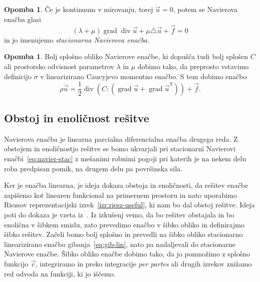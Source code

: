\documentclass[12pt,a4paper,twoside]{article}
\theoremstyle{definition} %
\newtheorem{opomba}[definicija]{Opomba}
\theoremstyle{plain} %
\numberwithin{equation}{section}
\newcommand{\T}{\mathsf{T}}
\newcommand{\lap}{\triangle}
\renewcommand{\div}{\operatorname{div}}
\newcommand{\grad}{\operatorname{grad}}
\newcommand{\vv}{\vec{v}}
\newcommand{\vu}{\vec{u}}
\newcommand{\vf}{\vec{f}}
\newcommand{\ts}{\sigma}
\begin{document}
\begin{opomba}
  Če je kontinuum v mirovanju, torej $\dot{\vu} = 0$, potem se Navierova enačba glasi
\begin{equation}
    (\lambda + \mu)\grad\div \vu + \mu \lap \vu + \vf  = 0
  \label{eq:navier-stac}
\end{equation}
in jo imenujemo \emph{stacionarna Navierova enačba}.
\end{opomba}
\begin{opomba}
  Bolj splošno obliko Navierove enačbe, ki dopušča tudi bolj splošen $C$ ali
  prostorsko odvisnost parametrov $\lambda$ in $\mu$
  dobimo tako, da preprosto vstavimo definicijo $\ts$ v linearizirano
  Caucyjevo momentno enačbo. S tem dobimo enačbo
  \begin{equation}
    \rho\ddot \vu = \frac12 \div(C:(\grad \vu + \grad\vu^\T)) + \vf.
    \label{eq:navier-general}
  \end{equation}
\end{opomba}

\subsection{Obstoj in enoličnost rešitve}
\label{sec:obstoj-enol}
Navierova enačba je linearna parcialna diferencialna enačba drugega reda.
Z obstojem in enoličnostjo rešitve se bomo ukvarjali pri stacionarni Navierovi
enačbi~\eqref{eq:navier-stac} z mešanimi robnimi pogoji pri katerih je na nekem
delu roba predpisan pomik, na drugem delu pa površinska sila.

Ker je enačba linearna, je ideja dokaza obstoja in enoličnosti, da rešitev
enačbe zapišemo kot linearen funkcional na primernem prostoru in nato uporabimo
Riezsov reprezentacijski izrek~\ref{izr:riesz-useful}, ki nam bo dal obstoj
rešitve. Ideja poti do dokaza je vzeta iz~\cite[izrek 3.17.1, str.\
232]{lebedev2009introduction}. Iz izkušenj vemo, da bo rešitev obstajala in bo
enolična v šibkem smislu, zato prevedimo enačbo v šibko obliko in definirajmo
šibko rešitev. Začeli bomo bolj splošno in prevedli na šibko obliko
stacionarno linearizirano enačbo gibanja~\eqref{eq:gib-lin}, nato pa nadaljevali
do stacionarne Navierove enačbe. Šibko obliko enačbe dobimo tako, da jo pomnožimo z splošno
funkcijo $\vv$, integriramo in preko integracije \emph{per partes} ali drugih
izrekov znižamo red odvoda na funkciji, ki jo iščemo.
\end{document}
